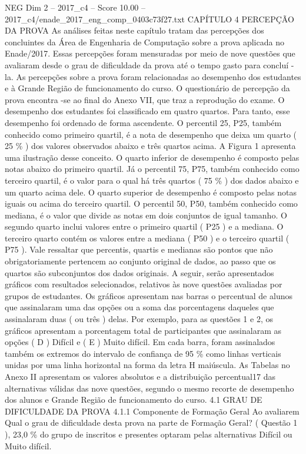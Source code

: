 \begin{textsample}{NEG Dim 2 – 2017\_c4 – Score 10.00 – 2017\_c4/enade\_2017\_eng\_comp\_0403c73f27.txt}  \label{ex:f2_neg_339}
CAPÍTULO 4 PERCEPÇÃO DA PROVA As análises feitas neste capítulo tratam das percepções dos concluintes da Área de Engenharia de Computação sobre a prova aplicada no Enade/2017.
Essas percepções foram mensuradas por meio de nove questões que avaliaram desde o grau de dificuldade da prova até o tempo gasto para concluí -la.
As percepções sobre a prova foram relacionadas ao desempenho dos estudantes e à Grande Região de funcionamento do curso.
O questionário de percepção da prova encontra -se ao final do Anexo VII, que traz a reprodução do exame.
O desempenho dos estudantes foi classificado em quatro quartos.
Para tanto, esse desempenho foi ordenado de forma ascendente.
O percentil 25, P25, também conhecido como primeiro quartil, é a nota de desempenho que deixa um quarto ( 25 \% ) dos valores observados abaixo e três quartos acima.
A Figura 1 apresenta uma ilustração desse conceito.
O quarto inferior de desempenho é composto pelas notas abaixo do primeiro quartil.
Já o percentil 75, P75, também conhecido como terceiro quartil, é o valor para o qual há três quartos ( 75 \% ) dos dados abaixo e um quarto acima dele.
O quarto superior de desempenho é composto pelas notas iguais ou acima do terceiro quartil.
O percentil 50, P50, também conhecido como mediana, é o valor que divide as notas em dois conjuntos de igual tamanho.
O segundo quarto inclui valores entre o primeiro quartil ( P25 ) e a mediana.
O terceiro quarto contém os valores entre a mediana ( P50 ) e o terceiro quartil ( P75 ).
Vale ressaltar que percentis, quartis e medianas são pontos que não obrigatoriamente pertencem ao conjunto original de dados, ao passo que os quartos são subconjuntos dos dados originais.
A seguir, serão apresentados gráficos com resultados selecionados, relativos às nove questões avaliadas por grupos de estudantes.
Os gráficos apresentam nas barras o percentual de alunos que assinalaram uma das opções ou a soma das porcentagens daqueles que assinalaram duas ( ou três ) delas.
Por exemplo, para as questões 1 e 2, os gráficos apresentam a porcentagem total de participantes que assinalaram as opções ( D ) Difícil e ( E ) Muito difícil.
Em cada barra, foram assinalados também os extremos do intervalo de confiança de 95 \% como linhas verticais unidas por uma linha horizontal na forma da letra H maiúscula.
As Tabelas no Anexo II apresentam os valores absolutos e a distribuição percentual17 das alternativas válidas das nove questões, segundo o mesmo recorte de desempenho dos alunos e Grande Região de funcionamento do curso. 4.1 GRAU DE DIFICULDADE DA PROVA 4.1.1 Componente de Formação Geral Ao avaliarem Qual o grau de dificuldade desta prova na parte de Formação Geral? ( Questão 1 ), 23,0 \% do grupo de inscritos e presentes optaram pelas alternativas Difícil ou Muito difícil.

\end{textsample}
